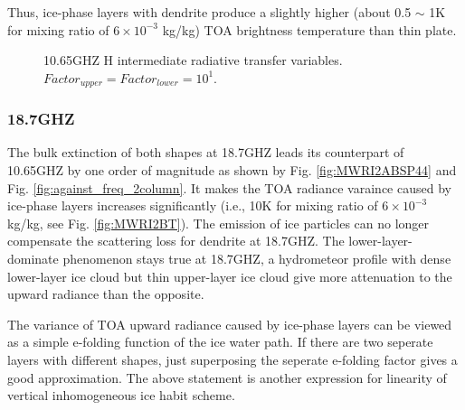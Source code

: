 Thus, ice-phase layers with dendrite produce a slightly higher (about 0.5 $\sim$ 1K for mixing ratio of $6 \times 10^{-3}$ kg/kg) TOA brightness temperature
than thin plate.



\begin{figure}[hbtp] 
\centering
{}
\caption{10.65GHZ H intermediate radiative transfer variables. $Factor_{upper} = Factor_{lower} = 10^{1}$.}
\label{fig:MWRI1rad}
\end{figure}

\clearpage

\subsubsection{18.7GHZ}

The bulk extinction of both shapes at 18.7GHZ leads its counterpart of 10.65GHZ by one order of magnitude as shown by 
Fig. \ref{fig:MWRI2ABSP44} and Fig. \ref{fig:against_freq_2column}. It makes the TOA radiance varaince caused by
ice-phase layers increases significantly (i.e., 10K for mixing ratio of $6 \times 10^{-3}$ kg/kg, see Fig. \ref{fig:MWRI2BT}).
The emission of ice particles can no longer compensate the scattering loss for dendrite at 18.7GHZ.
The lower-layer-dominate phenomenon stays true at 18.7GHZ, a hydrometeor profile with dense lower-layer ice cloud but thin upper-layer
ice cloud give more attenuation to the upward radiance than the opposite.


The variance of TOA upward radiance caused by ice-phase layers can be viewed as a simple e-folding function of the ice water path.
If there are two seperate layers with different shapes, just superposing the seperate e-folding factor gives a good approximation.
The above statement is another expression for linearity of vertical inhomogeneous ice habit scheme.

